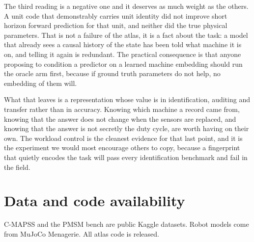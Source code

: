 \documentclass[11pt]{article}
\begin{document}
The third reading is a negative one and it deserves as much weight as the
others. A unit code that demonstrably carries unit identity did not improve
short horizon forward prediction for that unit, and neither did the true
physical parameters. That is not a failure of the atlas, it is a fact about the
task: a model that already sees a causal history of the state has been told
what machine it is on, and telling it again is redundant. The practical
consequence is that anyone proposing to condition a predictor on a learned
machine embedding should run the oracle arm first, because if ground truth
parameters do not help, no embedding of them will.

What that leaves is a representation whose value is in identification,
auditing and transfer rather than in accuracy. Knowing which machine a record
came from, knowing that the answer does not change when the sensors are
replaced, and knowing that the answer is not secretly the duty cycle, are worth
having on their own. The workload control is the cleanest evidence for that
last point, and it is the experiment we would most encourage others to copy,
because a fingerprint that quietly encodes the task will pass every
identification benchmark and fail in the field.

\section{Data and code availability}

C-MAPSS and the PMSM bench are public Kaggle datasets. Robot models come from
MuJoCo Menagerie. All atlas code is released.
\end{document}
